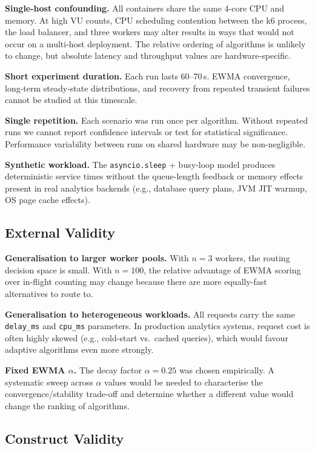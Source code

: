 \documentclass[conference]{IEEEtran}
\begin{document}
\textbf{Single-host confounding.} All containers share the same 4-core
CPU and memory. At high VU counts, CPU scheduling contention between
the k6 process, the load balancer, and three workers may alter results
in ways that would not occur on a multi-host deployment. The relative
ordering of algorithms is unlikely to change, but absolute latency and
throughput values are hardware-specific.

\textbf{Short experiment duration.} Each run lasts 60--70\,s. EWMA
convergence, long-term steady-state distributions, and recovery from
repeated transient failures cannot be studied at this timescale.

\textbf{Single repetition.} Each scenario was run once per algorithm.
Without repeated runs we cannot report confidence intervals or test
for statistical significance. Performance variability between runs on
shared hardware may be non-negligible.

\textbf{Synthetic workload.} The \texttt{asyncio.sleep} + busy-loop
model produces deterministic service times without the queue-length
feedback or memory effects present in real analytics backends
(e.g., database query plans, JVM JIT warmup, OS page cache effects).

\subsection{External Validity}

\textbf{Generalisation to larger worker pools.} With $n=3$ workers,
the routing decision space is small. With $n=100$, the relative
advantage of EWMA scoring over in-flight counting may change because
there are more equally-fast alternatives to route to.

\textbf{Generalisation to heterogeneous workloads.} All requests carry
the same \texttt{delay\_ms} and \texttt{cpu\_ms} parameters. In
production analytics systems, request cost is often highly skewed
(e.g., cold-start vs.\ cached queries), which would favour adaptive
algorithms even more strongly.

\textbf{Fixed EWMA $\alpha$.} The decay factor $\alpha=0.25$ was
chosen empirically. A systematic sweep across $\alpha$ values would
be needed to characterise the convergence/stability trade-off and
determine whether a different value would change the ranking of algorithms.

\subsection{Construct Validity}
\end{document}
